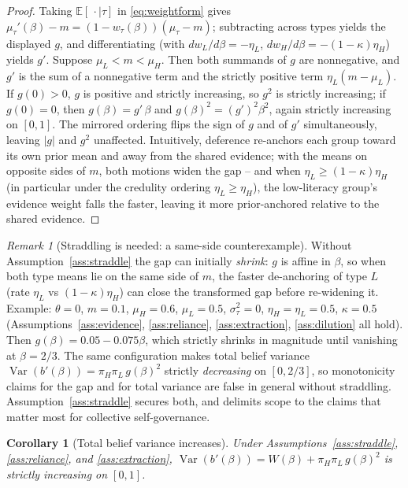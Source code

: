 \documentclass[11pt]{article}
\newtheorem{corollary}[theorem]{Corollary}
\theoremstyle{definition}
\theoremstyle{remark}
\newtheorem{remark}[theorem]{Remark}
\numberwithin{equation}{section}
\DeclareMathOperator{\Var}{Var}
\newcommand{\E}{\mathbb{E}}
\begin{document}
\begin{proof}
Taking $\E[\,\cdot \mid \tau]$ in \eqref{eq:weightform} gives $\mu_\tau'(\beta) - m = (1-w_\tau(\beta))(\mu_\tau - m)$; subtracting across types yields the displayed $g$, and differentiating (with $dw_L/d\beta = -\eta_L$, $dw_H/d\beta = -(1-\kappa)\eta_H$) yields $g'$. Suppose $\mu_L < m < \mu_H$. Then both summands of $g$ are nonnegative, and $g'$ is the sum of a nonnegative term and the strictly positive term $\eta_L(m-\mu_L)$. If $g(0) > 0$, $g$ is positive and strictly increasing, so $g^2$ is strictly increasing; if $g(0) = 0$, then $g(\beta) = g'\,\beta$ and $g(\beta)^2 = (g')^2 \beta^2$, again strictly increasing on $[0,1]$. The mirrored ordering flips the sign of $g$ and of $g'$ simultaneously, leaving $\lvert g \rvert$ and $g^2$ unaffected. Intuitively, deference re-anchors each group toward its own prior mean and away from the shared evidence; with the means on opposite sides of $m$, both motions widen the gap -- and when $\eta_L \ge (1-\kappa)\eta_H$ (in particular under the credulity ordering $\eta_L \ge \eta_H$), the low-literacy group's evidence weight falls the faster, leaving it more prior-anchored relative to the shared evidence.
\end{proof}

\begin{remark}[Straddling is needed: a same-side counterexample]\label{rem:counter}
Without Assumption~\ref{ass:straddle} the gap can initially \emph{shrink}: $g$ is affine in $\beta$, so when both type means lie on the same side of $m$, the faster de-anchoring of type $L$ (rate $\eta_L$ vs $(1-\kappa)\eta_H$) can close the transformed gap before re-widening it. Example: $\theta = 0$, $m = 0.1$, $\mu_H = 0.6$, $\mu_L = 0.5$, $\sigma_\tau^2 = 0$, $\eta_H = \eta_L = 0.5$, $\kappa = 0.5$ (Assumptions~\ref{ass:evidence}, \ref{ass:reliance}, \ref{ass:extraction}, \ref{ass:dilution} all hold). Then $g(\beta) = 0.05 - 0.075\beta$, which strictly shrinks in magnitude until vanishing at $\beta = 2/3$. The same configuration makes total belief variance $\Var(b'(\beta)) = \pi_H \pi_L\, g(\beta)^2$ strictly \emph{decreasing} on $[0, 2/3]$, so monotonicity claims for the gap and for total variance are false in general without straddling. Assumption~\ref{ass:straddle} secures both, and delimits scope to the claims that matter most for collective self-governance.
\end{remark}

\begin{corollary}[Total belief variance increases]\label{cor:totalvar}
Under Assumptions~\ref{ass:straddle}, \ref{ass:reliance}, and \ref{ass:extraction}, $\Var(b'(\beta)) = W(\beta) + \pi_H \pi_L\, g(\beta)^2$ is strictly increasing on $[0,1]$.
\end{corollary}
\end{document}
